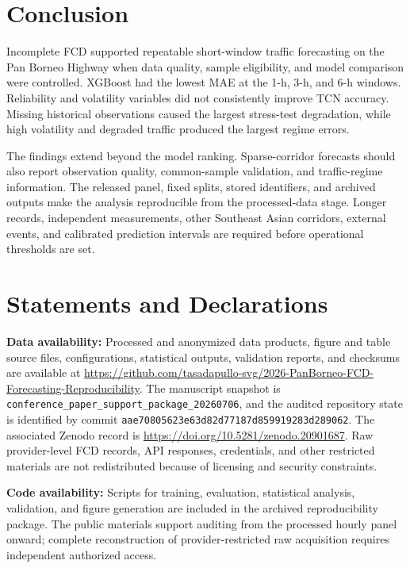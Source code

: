 \documentclass[smallcondensed]{svjour3}
\begin{document}
\section{Conclusion}
Incomplete FCD supported repeatable short-window traffic forecasting on the Pan Borneo Highway when data quality, sample eligibility, and model comparison were controlled. XGBoost had the lowest MAE at the 1-h, 3-h, and 6-h windows. Reliability and volatility variables did not consistently improve TCN accuracy. Missing historical observations caused the largest stress-test degradation, while high volatility and degraded traffic produced the largest regime errors.

The findings extend beyond the model ranking. Sparse-corridor forecasts should also report observation quality, common-sample validation, and traffic-regime information. The released panel, fixed splits, stored identifiers, and archived outputs make the analysis reproducible from the processed-data stage. Longer records, independent measurements, other Southeast Asian corridors, external events, and calibrated prediction intervals are required before operational thresholds are set.
\section*{Statements and Declarations}
\noindent\textbf{Data availability:} Processed and anonymized data products, figure and table source files, configurations, statistical outputs, validation reports, and checksums are available at \url{https://github.com/tasadapullo-svg/2026-PanBorneo-FCD-Forecasting-Reproducibility}. The manuscript snapshot is \nolinkurl{conference_paper_support_package_20260706}, and the audited repository state is identified by commit \nolinkurl{aae70805623e63d82d77187d859919283d289062}. The associated Zenodo record is \url{https://doi.org/10.5281/zenodo.20901687}. Raw provider-level FCD records, API responses, credentials, and other restricted materials are not redistributed because of licensing and security constraints.\par

\noindent\textbf{Code availability:} Scripts for training, evaluation, statistical analysis, validation, and figure generation are included in the archived reproducibility package. The public materials support auditing from the processed hourly panel onward; complete reconstruction of provider-restricted raw acquisition requires independent authorized access.\par
\end{document}
